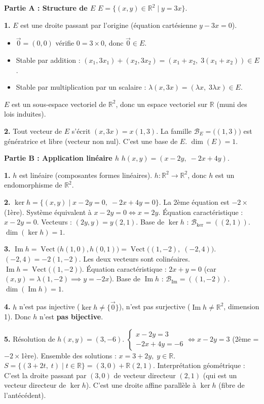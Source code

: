 \documentclass[11pt]{article}
\newcommand{\cle}[1]{{\popxbold\color{popdark}#1}}
\begin{document}
\begin{corrige}
\textbf{Partie A : Structure de $E$}
$E=\{(x,y)\in\mathbb{R}^2 \mid y=3x\}$.

\textbf{1.} $E$ est une droite passant par l'origine (équation cartésienne $y-3x=0$).
\begin{itemize}
    \item $\vec{0}=(0,0)$ vérifie $0=3\times0$, donc $\vec{0}\in E$.
    \item Stable par addition : $(x_1,3x_1)+(x_2,3x_2)=(x_1+x_2,\;3(x_1+x_2))\in E$.
    \item Stable par multiplication par un scalaire : $\lambda(x,3x)=(\lambda x,\;3\lambda x)\in E$.
\end{itemize}
$E$ est un sous-espace vectoriel de $\mathbb{R}^2$, donc un \cle{espace vectoriel} sur $\mathbb{R}$ (muni des lois induites).

\textbf{2.} Tout vecteur de $E$ s'écrit $(x,3x)=x(1,3)$.
La famille $\mathcal{B}_E = \big((1,3)\big)$ est génératrice et libre (vecteur non nul).
C'est une \cle{base} de $E$. $\dim(E)=1$.

\vspace{0.5em}
\textbf{Partie B : Application linéaire $h$}
$h(x,y)=(x-2y,\;-2x+4y)$.

\textbf{1.} $h$ est linéaire (composantes formes linéaires). $h:\mathbb{R}^2\to\mathbb{R}^2$, donc $h$ est un \cle{endomorphisme} de $\mathbb{R}^2$.

\textbf{2.} $\ker h = \{(x,y)\mid x-2y=0,\; -2x+4y=0\}$.
La 2ème équation est $-2\times$(1ère). Système équivalent à $x-2y=0 \iff x=2y$.
\cle{Équation caractéristique} : $x-2y=0$.
Vecteurs : $(2y,y)=y(2,1)$.
Base de $\ker h$ : $\boxed{\mathcal{B}_{\ker}=((2,1))}$. $\dim(\ker h)=1$.

\textbf{3.} $\operatorname{Im} h = \operatorname{Vect}\big(h(1,0), h(0,1)\big) = \operatorname{Vect}\big((1,-2),\;(-2,4)\big)$.
$(-2,4) = -2(1,-2)$. Les deux vecteurs sont colinéaires.
$\operatorname{Im} h = \operatorname{Vect}\big((1,-2)\big)$.
\cle{Équation caractéristique} : $2x+y=0$ (car $(x,y)=\lambda(1,-2) \implies y=-2x$).
Base de $\operatorname{Im} h$ : $\boxed{\mathcal{B}_{\operatorname{Im}}=((1,-2))}$. $\dim(\operatorname{Im} h)=1$.

\textbf{4.} $h$ n'est pas injective ($\ker h \neq \{\vec{0}\}$), n'est pas surjective ($\operatorname{Im} h \neq \mathbb{R}^2$, dimension 1).
Donc $h$ n'est \textbf{pas bijective}.

\textbf{5.} Résolution de $h(x,y)=(3,-6)$.
$\begin{cases} x-2y=3 \\ -2x+4y=-6 \end{cases} \iff x-2y=3$ (2ème = $-2\times$1ère).
Ensemble des solutions : $x = 3+2y,\; y\in\mathbb{R}$.
$\boxed{S = \{(3+2t,\;t) \mid t\in\mathbb{R}\} = (3,0) + \mathbb{R}(2,1)}$.
\cle{Interprétation géométrique :} C'est la droite passant par $(3,0)$ de vecteur directeur $(2,1)$ (qui est un vecteur directeur de $\ker h$). C'est une \cle{droite affine} parallèle à $\ker h$ (fibre de l'antécédent).


\end{corrige}
\end{document}
